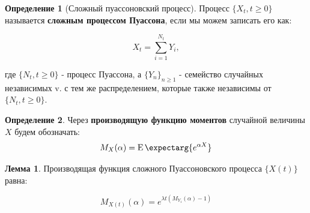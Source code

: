 \documentclass[a4paper,12pt]{article}
\theoremstyle{definition}
\newtheorem{definition}{Определение}[section]
\newtheorem{lemma}{Лемма}
\newcommand{\expect}{\operatorname{E}\expectarg}
\begin{document}
\begin{definition}[Сложный пуассоновский процесс]
    \label{def:compound_poisson}
    Процесс $\{X_t, t \ge 0\}$ называется \textbf{сложным процессом Пуассона}, если мы можем записать его как:
    
    \begin{equation}
        X_t = \sum_{i=1}^{N_t} Y_i,
    \end{equation}
    
    где $\{N_t, t \ge 0\}$ - процесс Пуассона, а $\{Y_n\}_{n \ge 1}$ - семейство случайных независимых v. с тем же распределением, которые также независимы от $\{N_t, t \ge 0\}$.
\end{definition}

\begin{definition}\label{def:moment_generating_function}
Через \textbf{производящую функцию моментов} случайной величины $X$ будем обозначать:
    \begin{equation*}
        M_X(\alpha) = \expect{e^{\alpha X}}
    \end{equation*}
\end{definition}

\begin{lemma}\label{thm:thm2_moment_generating_function}
Производящая функция сложного Пуассоновского процесса $\{X(t)\}$ равна:

\begin{equation}\label{eq:moment_generating_for_poisson}
     M_{X(t)}(\alpha) = e^{\lambda t \left(M_{Y_1}(\alpha) - 1\right)}
\end{equation}

\end{lemma}
\end{document}
